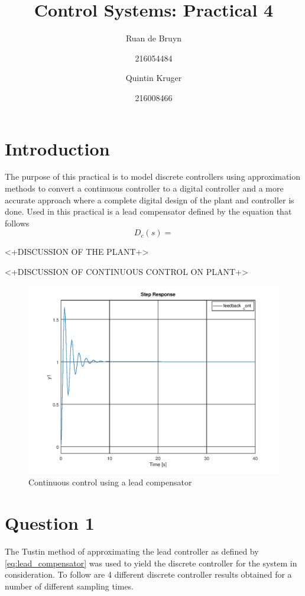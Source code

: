 \documentclass[a4paper, 12pt]{article}
\title{Control Systems: Practical 4}
\author{Ruan de Bruyn \and 216054484 \and Quintin Kruger \and 216008466}
\begin{document}
\maketitle
\newpage
{}
\tableofcontents
\listoffigures
\newpage
{}

\section{Introduction} %
\label{sec:introduction}
The purpose of this practical is to model discrete controllers using approximation methods to convert a continuous controller to a digital controller  and a more accurate approach where a complete digital design of the plant and controller is done. Used in this practical is a lead compensator defined by the equation that follows
\begin{equation}
	\label{eq:lead_compensator}
	D_c(s) = 
\end{equation}

<+DISCUSSION OF THE PLANT+>

<+DISCUSSION OF CONTINUOUS CONTROL ON PLANT+>
\begin{figure}[H]
  \centering
  \includegraphics[width=\textwidth]{img/continuous_control.png}
  \caption{Continuous control using a lead compensator}
  \label{fig:continuous_control}
\end{figure}

\section{Question 1} %
\label{sec:question_1}
The Tustin method of approximating the lead controller as defined by \eqref{eq:lead_compensator} was used to yield the discrete controller for the system in consideration. To follow are 4 different discrete controller results obtained for a number of different sampling times.
\end{document}
